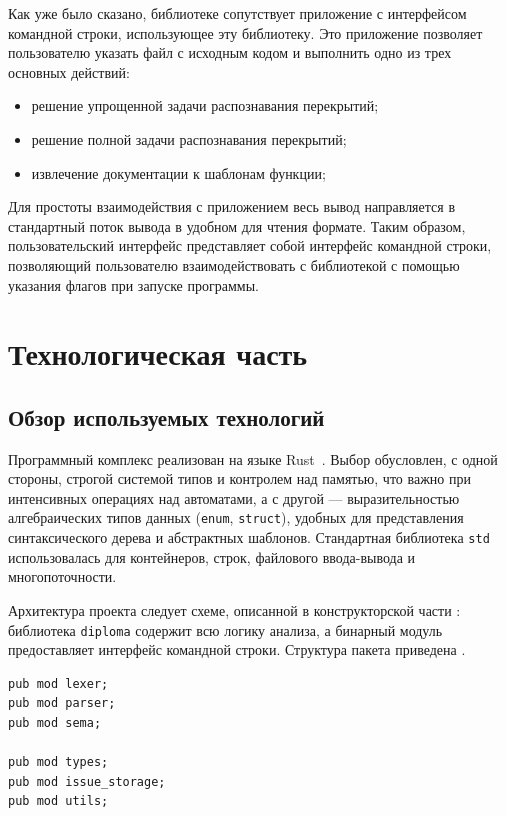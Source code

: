 Как уже было сказано, библиотеке сопутствует приложение с интерфейсом командной строки, использующее эту библиотеку.
Это приложение позволяет пользователю указать файл с исходным кодом и выполнить одно из трех основных действий:
\begin{itemize}
\item решение упрощенной задачи распознавания перекрытий;
\item решение полной задачи распознавания перекрытий;
\item извлечение документации к шаблонам функции;
\end{itemize}

Для простоты взаимодействия с приложением весь вывод направляется в стандартный поток вывода в удобном для чтения формате.
Таким образом, пользовательский интерфейс представляет собой интерфейс командной строки, позволяющий пользователю взаимодействовать с библиотекой с помощью указания флагов при запуске программы.

\section{Технологическая часть}

\subsection{Обзор используемых технологий}

Программный комплекс реализован на языке Rust~\cite{rust_std}.
Выбор обусловлен, с одной стороны, строгой системой типов и контролем над памятью, что важно при интенсивных операциях над автоматами, а с другой --- выразительностью алгебраических типов данных (\texttt{enum}, \texttt{struct}), удобных для представления синтаксического дерева и абстрактных шаблонов.
Стандартная библиотека \texttt{std} использовалась для контейнеров, строк, файлового ввода-вывода и многопоточности.

Архитектура проекта следует схеме, описанной в конструкторской части : библиотека \texttt{diploma} содержит всю логику анализа, а бинарный модуль предоставляет интерфейс командной строки.
Структура пакета приведена .

\begin{listing}[H]
\caption{Корневой модуль библиотеки \texttt{diploma}}
\label{lst:crate-root}
\begin{verbatim}
pub mod lexer;
pub mod parser;
pub mod sema;

pub mod types;
pub mod issue_storage;
pub mod utils;
\end{verbatim}
\end{listing}

